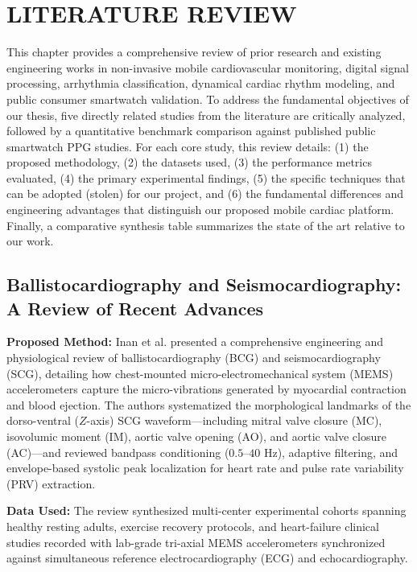 \chapter{LITERATURE REVIEW}

This chapter provides a comprehensive review of prior research and existing engineering works in non-invasive mobile cardiovascular monitoring, digital signal processing, arrhythmia classification, dynamical cardiac rhythm modeling, and public consumer smartwatch validation. To address the fundamental objectives of our thesis, five directly related studies from the literature are critically analyzed, followed by a quantitative benchmark comparison against published public smartwatch PPG studies. For each core study, this review details: (1) the proposed methodology, (2) the datasets used, (3) the performance metrics evaluated, (4) the primary experimental findings, (5) the specific techniques that can be adopted (stolen) for our project, and (6) the fundamental differences and engineering advantages that distinguish our proposed mobile cardiac platform. Finally, a comparative synthesis table summarizes the state of the art relative to our work.

\section{Ballistocardiography and Seismocardiography: A Review of Recent Advances \cite{inan2015ballistocardiography}}

\textbf{Proposed Method:} Inan et al. \cite{inan2015ballistocardiography} presented a comprehensive engineering and physiological review of ballistocardiography (BCG) and seismocardiography (SCG), detailing how chest-mounted micro-electromechanical system (MEMS) accelerometers capture the micro-vibrations generated by myocardial contraction and blood ejection. The authors systematized the morphological landmarks of the dorso-ventral ($Z$-axis) SCG waveform---including mitral valve closure (MC), isovolumic moment (IM), aortic valve opening (AO), and aortic valve closure (AC)---and reviewed bandpass conditioning ($0.5\text{--}40\text{ Hz}$), adaptive filtering, and envelope-based systolic peak localization for heart rate and pulse rate variability (PRV) extraction.

\textbf{Data Used:} The review synthesized multi-center experimental cohorts spanning healthy resting adults, exercise recovery protocols, and heart-failure clinical studies recorded with lab-grade tri-axial MEMS accelerometers synchronized against simultaneous reference electrocardiography (ECG) and echocardiography.


